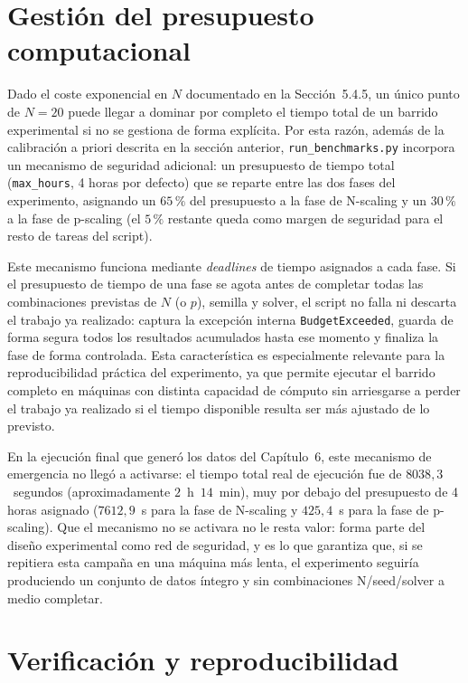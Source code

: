 \section{Gestión del presupuesto computacional}
\label{sec:presupuesto-computo}

Dado el coste exponencial en $N$ documentado en la Sección~5.4.5, un único punto de $N=20$ puede llegar a dominar por completo el tiempo total de un barrido experimental si no se gestiona de forma explícita. Por esta razón, además de la calibración a priori descrita en la sección anterior, \texttt{run\_benchmarks.py} incorpora un mecanismo de seguridad adicional: un presupuesto de tiempo total (\texttt{max\_hours}, 4 horas por defecto) que se reparte entre las dos fases del experimento, asignando un $65\,\%$ del presupuesto a la fase de N-scaling y un $30\,\%$ a la fase de p-scaling (el $5\,\%$ restante queda como margen de seguridad para el resto de tareas del script).

Este mecanismo funciona mediante \textit{deadlines} de tiempo asignados a cada fase. Si el presupuesto de tiempo de una fase se agota antes de completar todas las combinaciones previstas de $N$ (o $p$), semilla y solver, el script no falla ni descarta el trabajo ya realizado: captura la excepción interna \texttt{BudgetExceeded}, guarda de forma segura todos los resultados acumulados hasta ese momento y finaliza la fase de forma controlada. Esta característica es especialmente relevante para la reproducibilidad práctica del experimento, ya que permite ejecutar el barrido completo en máquinas con distinta capacidad de cómputo sin arriesgarse a perder el trabajo ya realizado si el tiempo disponible resulta ser más ajustado de lo previsto.

En la ejecución final que generó los datos del Capítulo~6, este mecanismo de emergencia no llegó a activarse: el tiempo total real de ejecución fue de $8038{,}3$~segundos (aproximadamente $2$~h~$14$~min), muy por debajo del presupuesto de 4 horas asignado ($7612{,}9$~s para la fase de N-scaling y $425{,}4$~s para la fase de p-scaling). Que el mecanismo no se activara no le resta valor: forma parte del diseño experimental como red de seguridad, y es lo que garantiza que, si se repitiera esta campaña en una máquina más lenta, el experimento seguiría produciendo un conjunto de datos íntegro y sin combinaciones N/seed/solver a medio completar.

\section{Verificación y reproducibilidad}
\label{sec:verificacion}

